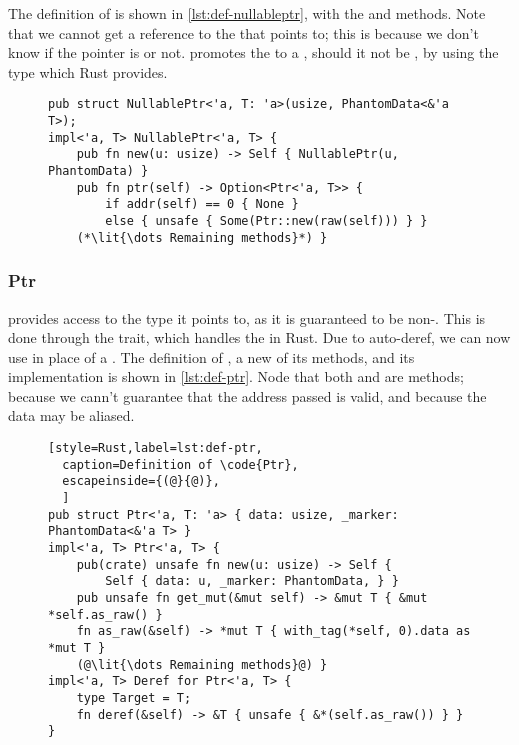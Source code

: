 The definition of  is shown in \cref{lst:def-nullableptr}, with the 
and  methods. Note that we cannot get a reference to the  that 
points to; this is because we don't know if the pointer is  or not.  promotes
the  to a , should it not be , by using the 
type which Rust provides.

\begin{figure}[ht]
  \begin{lstlisting}[style=Rust,label=lst:def-nullableptr,
  caption=Definition of \code{NullablePtr}]
pub struct NullablePtr<'a, T: 'a>(usize, PhantomData<&'a T>);
impl<'a, T> NullablePtr<'a, T> {
    pub fn new(u: usize) -> Self { NullablePtr(u, PhantomData) }
    pub fn ptr(self) -> Option<Ptr<'a, T>> {
        if addr(self) == 0 { None }
        else { unsafe { Some(Ptr::new(raw(self))) } }
    (*\lit{\dots Remaining methods}*) }
\end{lstlisting}
\end{figure}


\subsubsection{Ptr}

 provides access to the type it points to, as it is guaranteed to be non-.
This is done through the  trait, which handles the \code{*} in Rust. Due to auto-deref,
we can now use  in place of a . The definition of , a new of its
methods, and its  implementation is shown in \cref{lst:def-ptr}. Node that both
 and  are  methods;  because we cann't guarantee
that the address passed is valid, and  because the data may be aliased.

\begin{figure}[ht]
  \begin{lstlisting}[style=Rust,label=lst:def-ptr,
  caption=Definition of \code{Ptr},
  escapeinside={(@}{@)},
  ]
pub struct Ptr<'a, T: 'a> { data: usize, _marker: PhantomData<&'a T> }
impl<'a, T> Ptr<'a, T> {
    pub(crate) unsafe fn new(u: usize) -> Self {
        Self { data: u, _marker: PhantomData, } }
    pub unsafe fn get_mut(&mut self) -> &mut T { &mut *self.as_raw() }
    fn as_raw(&self) -> *mut T { with_tag(*self, 0).data as *mut T }
    (@\lit{\dots Remaining methods}@) }
impl<'a, T> Deref for Ptr<'a, T> {
    type Target = T;
    fn deref(&self) -> &T { unsafe { &*(self.as_raw()) } } }
\end{lstlisting}
\end{figure}


